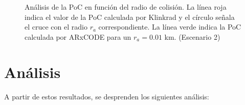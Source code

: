 \begin{figure}[!h]
  \centering
  \caption{An\'alisis de la PoC en funci\'on del radio de colisi\'on. La l\'inea roja indica el valor de la PoC calculada por Klinkrad \citep{Klinkrad} y el c\'irculo se\~nala el cruce con el radio $r_{a}$ correspondiente. La l\'inea verde indica la PoC calculada por ARxCODE para un $r_{a}=0.01$ km. (Escenario 2)}
  \label{fig:pocvsraEsc5}
\end{figure}

\newpage
\section{An\'alisis} 
 A partir de estos resultados, se desprenden los siguientes an\'alisis:\\
 
